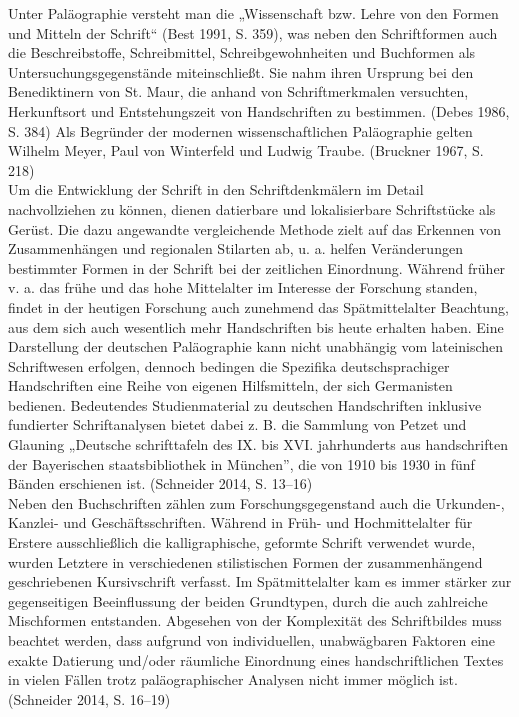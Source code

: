 \documentclass{article}
\begin{document}
    Unter Paläographie versteht man die „Wissenschaft bzw. Lehre von den Formen und Mitteln der Schrift“ (Best 1991, S. 359), was neben den Schriftformen auch die Beschreibstoffe, Schreibmittel, Schreibgewohnheiten und Buchformen als Untersuchungsgegenstände miteinschließt. Sie nahm ihren Ursprung bei den Benediktinern von St. Maur, die anhand von Schriftmerkmalen versuchten, Herkunftsort und Entstehungszeit von Handschriften zu bestimmen. (Debes 1986, S. 384) Als Begründer der modernen wissenschaftlichen Paläographie gelten Wilhelm Meyer, Paul von Winterfeld und Ludwig Traube. (Bruckner 1967, S. 218)\\
            
        Um die Entwicklung der Schrift in den Schriftdenkmälern im Detail nachvollziehen zu können, dienen datierbare und lokalisierbare Schriftstücke als Gerüst. Die dazu angewandte vergleichende Methode zielt auf das Erkennen von Zusammenhängen und regionalen Stilarten ab, u. a. helfen Veränderungen bestimmter Formen in der Schrift bei der zeitlichen Einordnung. Während früher v. a. das frühe und das hohe Mittelalter im Interesse der Forschung standen, findet in der heutigen Forschung auch zunehmend das Spätmittelalter Beachtung, aus dem sich auch wesentlich mehr Handschriften bis heute erhalten haben. Eine Darstellung der deutschen Paläographie kann nicht unabhängig vom lateinischen Schriftwesen erfolgen, dennoch bedingen die Spezifika deutschsprachiger Handschriften eine Reihe von eigenen Hilfsmitteln, der sich Germanisten bedienen. Bedeutendes Studienmaterial zu deutschen Handschriften inklusive fundierter Schriftanalysen bietet dabei z. B. die Sammlung von Petzet und Glauning „Deutsche schrifttafeln des IX. bis XVI. jahrhunderts aus handschriften der Bayerischen staatsbibliothek in München”, die von 1910 bis 1930 in fünf Bänden erschienen ist. (Schneider 2014, S. 13–16)\\
            
        Neben den Buchschriften zählen zum Forschungsgegenstand auch die Urkunden-, Kanzlei- und Geschäftsschriften. Während in Früh- und Hochmittelalter für Erstere ausschließlich die kalligraphische, geformte Schrift verwendet wurde, wurden Letztere in verschiedenen stilistischen Formen der zusammenhängend geschriebenen Kursivschrift verfasst. Im Spätmittelalter kam es immer stärker zur gegenseitigen Beeinflussung der beiden Grundtypen, durch die auch zahlreiche Mischformen entstanden. Abgesehen von der Komplexität des Schriftbildes muss beachtet werden, dass aufgrund von individuellen, unabwägbaren Faktoren eine exakte Datierung und/oder räumliche Einordnung eines handschriftlichen Textes in vielen Fällen trotz paläographischer Analysen nicht immer möglich ist. (Schneider 2014, S. 16–19)\\
            
\end{document}
